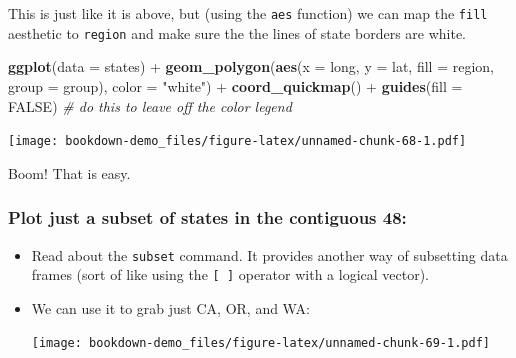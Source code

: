 \documentclass[]{book}
\newenvironment{Shaded}{\begin{snugshade}}{\end{snugshade}}
\newcommand{\KeywordTok}[1]{\textcolor[rgb]{0.13,0.29,0.53}{\textbf{{#1}}}}
\newcommand{\DataTypeTok}[1]{\textcolor[rgb]{0.13,0.29,0.53}{{#1}}}
\newcommand{\StringTok}[1]{\textcolor[rgb]{0.31,0.60,0.02}{{#1}}}
\newcommand{\CommentTok}[1]{\textcolor[rgb]{0.56,0.35,0.01}{\textit{{#1}}}}
\newcommand{\OtherTok}[1]{\textcolor[rgb]{0.56,0.35,0.01}{{#1}}}
\newcommand{\NormalTok}[1]{{#1}}
\theoremstyle{definition}
\theoremstyle{definition}
\theoremstyle{remark}
\begin{document}
This is just like it is above, but (using the \texttt{aes} function) we
can map the \texttt{fill} aesthetic to \texttt{region} and make sure the
the lines of state borders are white.

\begin{Shaded}
\begin{Highlighting}[]
\KeywordTok{ggplot}\NormalTok{(}\DataTypeTok{data =} \NormalTok{states) +}\StringTok{ }
\StringTok{  }\KeywordTok{geom_polygon}\NormalTok{(}\KeywordTok{aes}\NormalTok{(}\DataTypeTok{x =} \NormalTok{long, }\DataTypeTok{y =} \NormalTok{lat, }\DataTypeTok{fill =} \NormalTok{region, }\DataTypeTok{group =} \NormalTok{group), }\DataTypeTok{color =} \StringTok{"white"}\NormalTok{) +}\StringTok{ }
\StringTok{  }\KeywordTok{coord_quickmap}\NormalTok{() +}
\StringTok{  }\KeywordTok{guides}\NormalTok{(}\DataTypeTok{fill =} \OtherTok{FALSE}\NormalTok{)  }\CommentTok{# do this to leave off the color legend}
\end{Highlighting}
\end{Shaded}

\texttt{[image: bookdown-demo\_files/figure-latex/unnamed-chunk-68-1.pdf]}

Boom! That is easy.

\subsubsection{Plot just a subset of states in the contiguous
48:}\label{plot-just-a-subset-of-states-in-the-contiguous-48}

\begin{itemize}
\item
  Read about the \texttt{subset} command. It provides another way of
  subsetting data frames (sort of like using the \texttt{{[}\ {]}}
  operator with a logical vector).
\item
  We can use it to grab just CA, OR, and WA:

\begin{Shaded}
\end{Shaded}

  \texttt{[image: bookdown-demo\_files/figure-latex/unnamed-chunk-69-1.pdf]}
\end{itemize}
\end{document}
